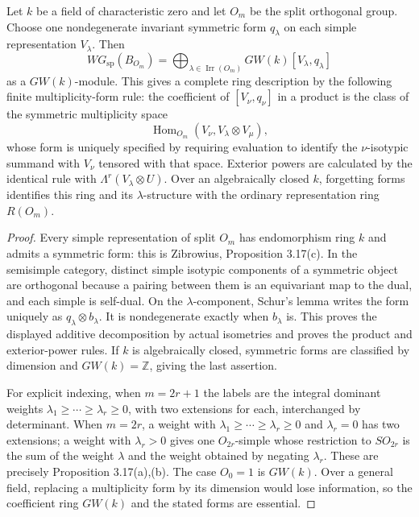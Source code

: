 \begin{proposition}
\label{C:orthogonal_representation_ring}
Let $k$ be a field of characteristic zero and let $O_m$ be the split
orthogonal group. Choose one nondegenerate invariant symmetric form $q_\lambda$
on each simple representation $V_\lambda$. Then
\[
 WG_{\mathrm{sp}}(B_{O_m})
   =\bigoplus_{\lambda\in\operatorname{Irr}(O_m)}GW(k)[V_\lambda,q_\lambda]
\]
as a $GW(k)$-module. This gives a complete ring description by the following
finite multiplicity-form rule: the coefficient of $[V_\nu,q_\nu]$ in a
product is the class of the symmetric multiplicity space
\[
 \operatorname{Hom}_{O_m}(V_\nu,V_\lambda\otimes V_\mu),
\]
whose form is uniquely specified by requiring evaluation to identify the
$\nu$-isotypic summand with $V_\nu$ tensored with that space. Exterior powers
are calculated by the identical rule with $\Lambda^r(V_\lambda\otimes U)$.
Over an algebraically closed $k$, forgetting forms identifies this ring and
its $\lambda$-structure with the ordinary representation ring $R(O_m)$.
\end{proposition}
\begin{proof}
Every simple representation of split $O_m$ has endomorphism ring $k$ and
admits a symmetric form: this is Zibrowius, Proposition 3.17(c). In the
semisimple category, distinct simple isotypic components of a symmetric
object are orthogonal because a pairing between them is an equivariant map
to the dual, and each simple is self-dual. On the $\lambda$-component,
Schur's lemma writes the form uniquely as $q_\lambda\otimes b_\lambda$.
It is nondegenerate exactly when $b_\lambda$ is. This proves the displayed
additive decomposition by actual isometries and proves the product and
exterior-power rules. If $k$ is algebraically closed, symmetric forms are
classified by dimension and $GW(k)=\mathbb Z$, giving the last assertion.

For explicit indexing, when $m=2r+1$ the labels are the integral dominant
weights $\lambda_1\geq\cdots\geq\lambda_r\geq0$, with two extensions for each,
interchanged by determinant. When $m=2r$, a weight with
$\lambda_1\geq\cdots\geq\lambda_r\geq0$ and $\lambda_r=0$ has two extensions;
a weight with $\lambda_r>0$ gives one $O_{2r}$-simple whose restriction to
$SO_{2r}$ is the sum of the weight $\lambda$ and the weight obtained by
negating $\lambda_r$. These are precisely Proposition 3.17(a),(b).
The case $O_0=1$ is $GW(k)$. Over a general field, replacing a multiplicity
form by its dimension would lose information, so the coefficient ring
$GW(k)$ and the stated forms are essential.
\end{proof}

